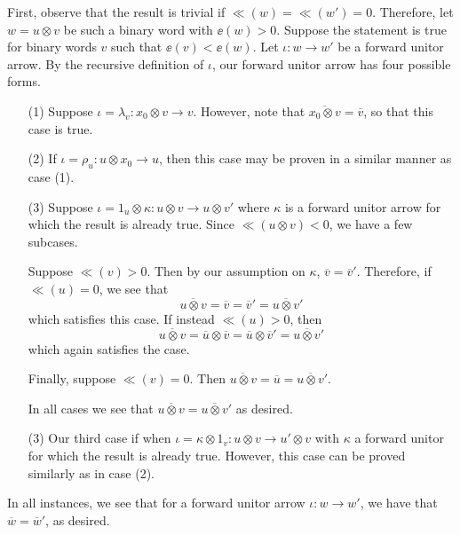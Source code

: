 \begin{prf}
    First, observe that the result is trivial if $\ll(w) = \ll(w') = 0$. 
    Therefore, let $w = u \otimes v$ be such a binary 
    word with $\ee(w) > 0$.
    Suppose the statement is true for 
    binary words $v$ such that $\ee(v) < \ee(w)$. 
    Let $\iota:w \to w'$ be a forward unitor arrow. 
    By the recursive definition of $\iota$, our forward unitor arrow has 
    four possible forms. 

    \begin{itemize}
        \item[(1)] Suppose $\iota = \lambda_v: x_0 \otimes v \to v$. 
        However, note that $\overline{x_0 \otimes v} = \overline{v}$, 
        so that this case is true. 
        
        \item[(2)] If $\iota = \rho_u: u \otimes x_0 \to u$, 
        then this case may be proven in a similar manner as case (1).

        \item[(3)] Suppose 
        $\iota = 1_u \otimes \kappa: u \otimes v \to u \otimes v'$ where 
        $\kappa$ is a forward unitor arrow for which the result is already true. 
        Since $\ll(u \otimes v) < 0$, we have a few subcases. 

        Suppose $\ll(v) > 0$. 
        Then by our assumption on $\kappa$, 
        $\overline{v} = \overline{v}'$.
        Therefore, if 
        $\ll(u) = 0$, we see that 
        \[
            \overline{u \otimes v} = \overline{v} 
            = \overline{v}' = \overline{u \otimes v}'
        \]
        which satisfies this case. 
        If instead $\ll(u) > 0$, then 
        \[
            \overline{u \otimes v} = \overline{u}\otimes\overline{v} = 
            \overline{u}\otimes\overline{v}' = \overline{u \otimes v}'
        \]
        which again satisfies the case. 

        Finally, suppose $\ll(v) = 0$. 
        Then $\overline{u \otimes v} = 
        \overline{u} = \overline{u \otimes v}'$. 

        In all cases we see that $\overline{u \otimes v} = \overline{u \otimes v}'$ 
        as desired. 

        \item[(3)] Our third case if when $\iota = \kappa \otimes 1_v: u \otimes v \to u' \otimes v$ 
        with $\kappa$ a forward  unitor for which the result is already true. However, this 
        case can be proved similarly as in case (2).
    \end{itemize}
    In all instances, we see that for a forward unitor arrow $\iota: w \to w'$, 
    we have that $\overline{w} = \overline{w}'$, as desired. 
\end{prf}

